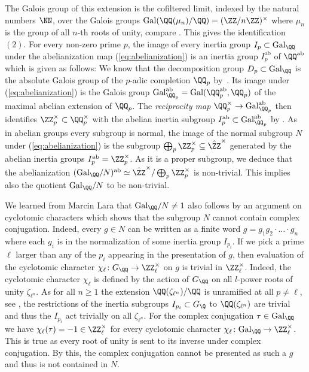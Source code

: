 \documentclass[leqno]{article}
\newcommand{\ab}{\mathrm{ab}}
\renewcommand{\Gal}{\mathrm{Gal}}
\begin{document}
\begin{example}
The Galois group of this extension is the cofiltered limit, indexed by the natural numbers $\NN$, over the Galois groups $\Gal(\QQ(\mu_{n})/\QQ)=(\ZZ/n\ZZ)^{\times}$ where $\mu_n$ is the group of all $n$-th roots of unity, compare \cite[Chapter IV, §2, Example 6]{Algebraicnumbertheory}. This gives the identification $(2)$.
For every non-zero prime $p$, the image of every inertia group $I_p\subset \Gal_{\QQ}$ under the abelianization map (\ref{eq:abelianization}) is an inertia group $I_p^{\mathrm{ab}}$ of $\QQ^{\mathrm{ab}}$ which is given as follows:
We know that the decomposition group $D_p\subset \Gal_{\QQ}$ is the absolute Galois group of the $p$-adic completion $\QQ_p$ by~\cite[Chapter II, §3, Corollary~4]{Localfields}.
Its image under (\ref{eq:abelianization}) is the Galois group $\Gal_{\QQ_p}^{\mathrm{ab}}=\Gal(\QQ_p^{\mathrm{ab}}, \QQ_p)$ of the maximal abelian extension of $\QQ_p$.
The \textit{reciprocity map} $\QQ_p^{\times} \rightarrow \Gal_{\QQ_p}^{\mathrm{ab}}$ then identifies $\ZZ_p^{\times}\subset \QQ_p^{\times}$ with the abelian inertia subgroup $I_p^{\mathrm{ab}}\subset\Gal_{\QQ_p}^{\mathrm{ab}}$ by \cite[Lemma 9.8]{classfieldtheory}. As in abelian groups every subgroup is normal, the image of the normal subgroup $N$ under (\ref{eq:abelianization}) is the subgroup $\bigoplus_p \ZZ_p^{\times}\subseteq \hat{\ZZ}^\times$ generated by the abelian inertia groups $I_p^{\ab}=\ZZ_p^{\times}$. As it is a proper subgroup, we deduce that the abelianization $(\Gal_{\QQ}/N)^{\ab}\simeq\hat{\ZZ}^{\times}/\bigoplus_p \ZZ_p^{\times}$ is non-trivial. This implies also the quotient $\Gal_{\QQ}/N$ to be non-trivial.
\end{example}
\begin{remark}
We learned from Marcin Lara that $\Gal_{\QQ}/N\neq 1$ also follows by an argument on cyclotomic characters which shows that the subgroup $N$ cannot contain complex conjugation. Indeed, every $g\in N$ can be written as a finite word $g=g_1g_2\cdot\dots\cdot g_n$ where each $g_i$ is in the normalization of some inertia group $I_{p_i}$. If we pick a prime $\ell$ larger than any of the $p_i$ appearing in the presentation of $g$, then evaluation of the cyclotomic character $\chi_{\ell}\colon G_{\QQ}\rightarrow \ZZ_{\ell}^{\times}$ on $g$ is trivial in $\ZZ_{\ell}^{\times}$. Indeed, the cyclotomic character $\chi_{\ell}$ is defined by the action of $G_{\QQ}$ on all $l$-power roots of unity $\zeta_{\ell
^n}$. As for all $n \geq 1$ the extension $\QQ(\zeta_{\ell
^n})/\QQ$ is unramified at all $p\neq \ell$, see \cite[Chapter I, Corollary 10.4]{Algebraicnumbertheory}, the restrictions of the inertia subgroups $I_{p_i}\subset G_{\Q}$ to  $\QQ(\zeta_{\ell
^n})$ are trivial and thus the $I_{p_i}$ act trivially on all $\zeta_{\ell
^n}$. For the complex conjugation $\tau\in \Gal_{\QQ}$ we have $\chi_{\ell}(\tau)=-1\in \ZZ_{\ell}^{\times}$ for every cyclotomic character $\chi_{\ell}\colon \Gal_{\QQ}\rightarrow \ZZ_{\ell}^{\times}$. This is true as every root of unity is sent to its inverse under complex conjugation. By this, the complex conjugation cannot be presented as such a $g$ and thus is not contained in $N$.
\end{remark}
\end{document}
